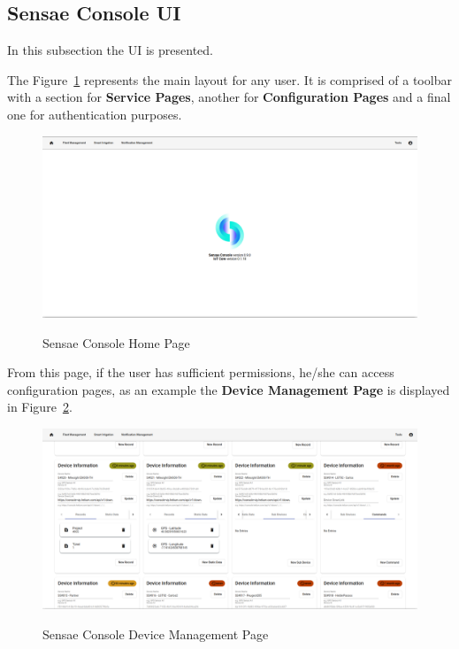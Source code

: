 \subsection{Sensae Console UI}
\label{subsec:implementation:description:ui}

In this subsection the \gls{UI} is presented.

The Figure~\ref{fig:implementation:description:ui:home} represents the main layout for any user. It is comprised of a toolbar with a section for \textbf{Service Pages}, another for \textbf{Configuration Pages} and a final one for authentication purposes.

\begin{figure}[H]
    \centering
    \resizebox{\columnwidth}{!}
    {
       \includegraphics{assets/figures/ui/home.png}
    }
    \caption[Sensae Console Home Page]{Sensae Console Home Page}
    \label{fig:implementation:description:ui:home}
\end{figure}

From this page, if the user has sufficient permissions, he/she can access configuration pages, as an example the \textbf{Device Management Page} is displayed in Figure~\ref{fig:implementation:description:ui:device}.

\begin{figure}[H]
    \centering
    \resizebox{\columnwidth}{!}
    {
       \includegraphics{assets/figures/ui/device-management.png}
    }
    \caption[Sensae Console Device Management Page]{Sensae Console Device Management Page}
    \label{fig:implementation:description:ui:device}
\end{figure}

